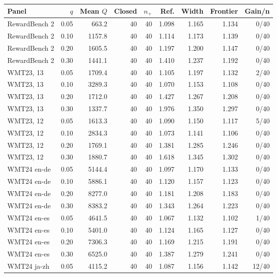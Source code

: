 \begin{table}[t]
\centering\small
\setlength{\tabcolsep}{4pt}
\begin{tabular}{lrrrrrrrr}
\toprule
Panel & $q$ & Mean $Q$ & Closed & $n_+$ & Ref. & Width & Frontier & Gain/n \\
\midrule
RewardBench 2 & 0.05 & 663.2 & 40 & 40 & 1.098 & 1.165 & 1.134 & 0/40 \\
RewardBench 2 & 0.10 & 1157.8 & 40 & 40 & 1.114 & 1.173 & 1.139 & 0/40 \\
RewardBench 2 & 0.20 & 1605.5 & 40 & 40 & 1.197 & 1.200 & 1.147 & 0/40 \\
RewardBench 2 & 0.30 & 1441.1 & 40 & 40 & 1.410 & 1.237 & 1.192 & 0/40 \\
WMT23, 13 & 0.05 & 1709.4 & 40 & 40 & 1.105 & 1.197 & 1.132 & 2/40 \\
WMT23, 13 & 0.10 & 3289.3 & 40 & 40 & 1.070 & 1.153 & 1.108 & 0/40 \\
WMT23, 13 & 0.20 & 1712.0 & 40 & 40 & 1.427 & 1.267 & 1.208 & 0/40 \\
WMT23, 13 & 0.30 & 1337.7 & 40 & 40 & 1.976 & 1.350 & 1.297 & 0/40 \\
WMT23, 12 & 0.05 & 1613.3 & 40 & 40 & 1.090 & 1.150 & 1.117 & 5/40 \\
WMT23, 12 & 0.10 & 2834.3 & 40 & 40 & 1.073 & 1.141 & 1.106 & 0/40 \\
WMT23, 12 & 0.20 & 1769.1 & 40 & 40 & 1.381 & 1.285 & 1.246 & 0/40 \\
WMT23, 12 & 0.30 & 1880.7 & 40 & 40 & 1.618 & 1.345 & 1.302 & 0/40 \\
WMT24 en-de & 0.05 & 5144.4 & 40 & 40 & 1.097 & 1.170 & 1.133 & 0/40 \\
WMT24 en-de & 0.10 & 5886.1 & 40 & 40 & 1.120 & 1.157 & 1.123 & 0/40 \\
WMT24 en-de & 0.20 & 8277.0 & 40 & 40 & 1.181 & 1.208 & 1.183 & 0/40 \\
WMT24 en-de & 0.30 & 8383.2 & 40 & 40 & 1.343 & 1.264 & 1.223 & 0/40 \\
WMT24 en-es & 0.05 & 4641.5 & 40 & 40 & 1.067 & 1.132 & 1.102 & 1/40 \\
WMT24 en-es & 0.10 & 5401.0 & 40 & 40 & 1.124 & 1.165 & 1.127 & 0/40 \\
WMT24 en-es & 0.20 & 7306.3 & 40 & 40 & 1.169 & 1.215 & 1.191 & 0/40 \\
WMT24 en-es & 0.30 & 6525.0 & 40 & 40 & 1.387 & 1.279 & 1.241 & 0/40 \\
WMT24 ja-zh & 0.05 & 4115.2 & 40 & 40 & 1.087 & 1.156 & 1.142 & 12/40 \\

\end{tabular}
\end{table}
